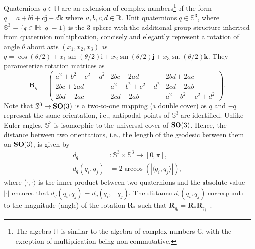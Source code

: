 Quaternions $q \in \mathbb{H}$ are an extension of complex numbers\footnote{The algebra $\mathbb{H}$ is similar to the algebra of complex numbers $\mathbb{C}$, with the exception of multiplication being non-commutative.} of the form $q = a + b\boldsymbol{i} + c\boldsymbol{j} + d\boldsymbol{k}$ where $a,b,c,d \in \mathbb{R}$.
Unit quaternions $q \in \mathbb{S}^3$, where $\mathbb{S}^3 = \big\{ q \in \mathbb{H}: \lvert q \rvert = 1 \big\}$ is the 3-sphere with the additional group structure inherited from quaternion multiplication, concisely and elegantly represent a rotation of angle $\theta$ about axis $(x_1, x_2, x_3)$ as $q = \cos(\theta/2) + x_1 \sin(\theta/2) \boldsymbol{i} + x_2 \sin(\theta/2) \boldsymbol{j} + x_3 \sin(\theta/2) \boldsymbol{k}$.
They parameterize rotation matrices as
\begin{equation*}
    \mathbf{R}_q =
    \begin{pmatrix}
        a^2+b^2-c^2-d^2 & 2bc-2ad & 2bd+2ac \\
        2bc+2ad & a^2-b^2+c^2-d^2 & 2cd-2ab \\
        2bd-2ac & 2cd+2ab & a^2-b^2-c^2+d^2
    \end{pmatrix}.
\end{equation*}
Note that $\mathbb{S}^3 \rightarrow \mathrm{\mathbf{SO}}(3)$ is a two-to-one mapping (a double cover) as $q$ and $-q$ represent the same orientation, i.e., antipodal points of $\mathbb{S}^3$ are identified.
Unlike Euler angles, $\mathbb{S}^3$ is isomorphic to the universal cover of $\mathrm{\mathbf{SO}}(3)$.
Hence, the distance between two orientations, i.e., the length of the geodesic between them on $\mathrm{\mathbf{SO}}(3)$, is given by
\begin{equation}
    \begin{aligned}
        d_q &: \mathbb{S}^3 \times \mathbb{S}^3 \rightarrow [0,\pi], \\
        d_q(q_i, q_j) &= 2 \arccos \left( \left| \langle q_i, q_j \rangle \right| \right),
    \label{eqn:distance:orientations}
    \end{aligned}
\end{equation}
where $\langle \cdot, \cdot \rangle$ is the inner product between two quaternions and the absolute value $\left| \cdot \right|$ ensures that $d_q(q_i, q_j) = d_q(q_i, -q_j)$.
The distance $d_q(q_i, q_j)$ corresponds to the magnitude (angle) of the rotation $\mathbf{R}_*$ such that $\mathbf{R}_{q_i} = \mathbf{R}_* \mathbf{R}_{q_j}$~\cite{huynh2009metrics}.

